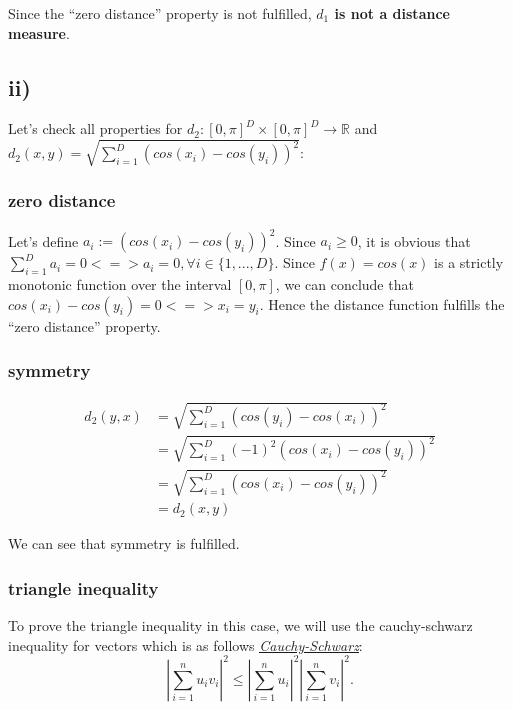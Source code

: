 Since the ``zero distance'' property is not fulfilled, \textbf{$d_1$ is not 
a distance measure}.


\subsection*{ii)} %
\label{sub:ii}

Let's check all properties for $d_2: \left[0,\pi\right]^D \times \left[0,\pi\right]^D \to \mathbb{R}$
and $d_2(x,y) = \sqrt{\sum_{i=1}^{D}(cos(x_i)-cos(y_i))^2}$:

\subsubsection*{zero distance} %
\label{ssub:zero_distance}
Let's define $a_i := (cos(x_i) - cos(y_i))^2$. Since $a_i \geq 0$, it is obvious that $\sum_{i=1}^{D}a_i = 0 <=> a_i = 0, \forall i \in \{1,...,D\}$.
Since $f(x) = cos(x)$ is a strictly monotonic function over the interval $\left[0,\pi\right]$, we can conclude 
that $cos(x_i)-cos(y_i) = 0 <=> x_i = y_i$. Hence the distance function fulfills the ``zero distance'' property.


\subsubsection*{symmetry} %
\label{ssub:symmetry}

\begin{align}
    d_2(y,x) &= \sqrt{\sum_{i=1}^{D}(cos(y_i)-cos(x_i))^2}\\
     &= \sqrt{\sum_{i=1}^{D}(-1)^2(cos(x_i)-cos(y_i))^2}\\
     &= \sqrt{\sum_{i=1}^{D}(cos(x_i)-cos(y_i))^2}\\
     &= d_2(x,y)
\end{align}

We can see that symmetry is fulfilled.


\subsubsection*{triangle inequality} %
\label{ssub:triangle_inequality}

To prove the triangle inequality in this case, 
we will use the cauchy-schwarz inequality for vectors
which is as follows \href{https://en.wikipedia.org/wiki/Cauchy%E2%80%93Schwarz_inequality}{\textit{\underline{Cauchy-Schwarz}}}:
\[
|\sum_{i=1}^{n}u_iv_i|^2 \leq |\sum_{i=1}^{n}u_i|^2|\sum_{i=1}^{n}v_i|^2.
\] 


